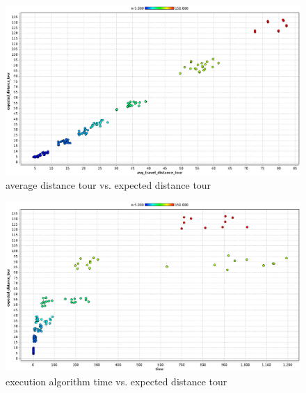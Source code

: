 \begin{figure}[!htbp]
  \begin{center}
   \includegraphics[width=1\textwidth]{Images/Chapter5/avg_vs_expected_distance_tour.eps}
  \end{center}
    \caption{average distance tour vs. expected distance tour}\label{fig:avg_distance_vs_expected_distance_tour}
\end{figure}

\begin{figure}[!htbp]
  \begin{center}
   \includegraphics[width=1\textwidth]{Images/Chapter5/time_vs_expected_distance_tour.eps}
  \end{center}
    \caption{execution algorithm time vs. expected distance tour}\label{fig:time_distance_vs_expected_distance_tour}
\end{figure}